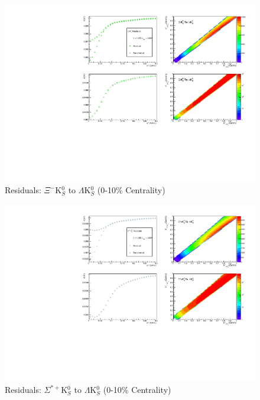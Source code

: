 \documentclass[../AnalysisNoteJBuxton.tex]{subfiles}
\begin{document}
\begin{figure}[h]
  \centering
  \includegraphics[width=\textwidth]{9_AdditionalFigures/Figures/Residuals/LamK0/Residuals_LamK0_0010_XiK0_MomResCrctn_NonFlatBgdCrctn_SingleLamParam_ResidualsIncluded_UsingCoulombOnlyInterpCfs.pdf}
  \caption[Residuals: $\Xi^{-}$K$^{0}_{S}$ to $\Lambda$K$^{0}_{S}$ (0-10\% Centrality)]{Residuals: $\Xi^{-}$K$^{0}_{S}$ to $\Lambda$K$^{0}_{S}$ (0-10\% Centrality)}
  \label{fig:Res_LamK0_0010_XiCK0}
\end{figure}


\begin{figure}[h]
  \centering
  \includegraphics[width=\textwidth]{9_AdditionalFigures/Figures/Residuals/LamK0/Residuals_LamK0_0010_SigStPK0_MomResCrctn_NonFlatBgdCrctn_SingleLamParam_ResidualsIncluded_UsingCoulombOnlyInterpCfs.pdf}
  \caption[Residuals: $\Sigma^{*+}$K$^{0}_{S}$ to $\Lambda$K$^{0}_{S}$ (0-10\% Centrality)]{Residuals: $\Sigma^{*+}$K$^{0}_{S}$ to $\Lambda$K$^{0}_{S}$ (0-10\% Centrality)}
  \label{fig:Res_LamK0_0010_SigStPK0}
\end{figure}
\end{document}
